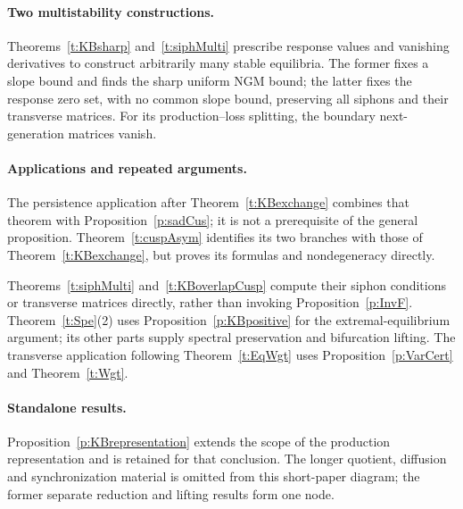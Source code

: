 \paragraph{Two multistability constructions.}
Theorems~\ref{t:KBsharp} and~\ref{t:siphMulti}  prescribe response values and vanishing derivatives to construct
arbitrarily many stable equilibria. The former fixes a slope bound and
finds the sharp uniform NGM bound; the latter fixes the response zero set,
with no common slope bound, preserving all siphons and their transverse
matrices. For its production--loss splitting, the boundary next-generation
matrices vanish.

\paragraph{Applications and repeated arguments.}
The persistence application after Theorem~\ref{t:KBexchange} combines that
theorem with Proposition~\ref{p:sadCus}; it is not a prerequisite of the
general proposition. Theorem~\ref{t:cuspAsym} identifies its two branches
with those of Theorem~\ref{t:KBexchange}, but proves its formulas and
nondegeneracy directly.

Theorems~\ref{t:siphMulti} and~\ref{t:KBoverlapCusp} compute their siphon
conditions or transverse matrices directly, rather than invoking
Proposition~\ref{p:InvF}.
Theorem~\ref{t:Spe}(2) uses Proposition~\ref{p:KBpositive} for
the extremal-equilibrium argument; its other parts supply spectral
preservation and bifurcation lifting.
The transverse application following Theorem~\ref{t:EqWgt}
uses Proposition~\ref{p:VarCert} and Theorem~\ref{t:Wgt}.


\paragraph{Standalone results.}
Proposition~\ref{p:KBrepresentation} extends the scope of the production
representation and is retained for that conclusion. The longer quotient,
diffusion and synchronization material is omitted from this short-paper
diagram; the former separate reduction and lifting results form one node.
\fi

